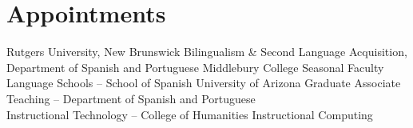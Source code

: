 \section{Appointments}

        {Rutgers University, New Brunswick}
        {\mytitle}
        {}
        {}
        {Bilingualism \& Second Language Acquisition, 
        Department of Spanish and Portuguese}
        {Middlebury College}
        {Seasonal Faculty}
        {}
        {}
        {Language Schools -- School of Spanish}
        {University of Arizona}
        {Graduate Associate}
        {}
        {}
        {Teaching -- Department of Spanish and Portuguese \\
        Instructional Technology -- College of Humanities Instructional Computing}



